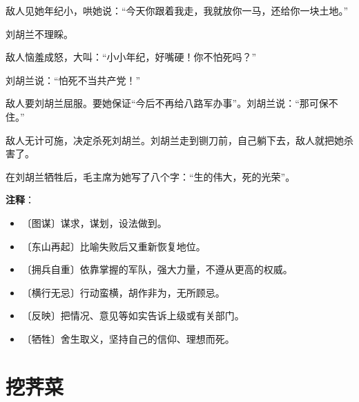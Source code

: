 \documentclass[12pt,UTF-8,openany]{ctexbook}
\begin{document}
\begin{normalsize}
    敌人见她年纪小，哄她说：“今天你跟着我走，我就放你一马，还给你一块土地。”
    
    刘胡兰不理睬。
    
    敌人恼羞成怒，大叫：“小小年纪，好嘴硬！你不怕死吗？”
    
    刘胡兰说：“怕死不当共产党！”
    
    敌人要刘胡兰屈服。要她保证“今后不再给八路军办事”。刘胡兰说：“那可保不住。”
    
    敌人无计可施，决定杀死刘胡兰。刘胡兰走到铡刀前，自己躺下去，敌人就把她杀害了。
    
    在刘胡兰牺牲后，毛主席为她写了八个字：“生的伟大，死的光荣”。
    
\end{normalsize}


\newpage

\textbf{注释}：

\vspace{-1em}

\begin{itemize}
    \setlength\itemsep{-0.2em}
    \item 〔图谋〕谋求，谋划，设法做到。
    \item 〔东山再起〕比喻失败后又重新恢复地位。
    \item 〔拥兵自重〕依靠掌握的军队，强大力量，不遵从更高的权威。
    \item 〔横行无忌〕行动蛮横，胡作非为，无所顾忌。
    \item 〔反映〕把情况、意见等如实告诉上级或有关部门。
    \item 〔牺牲〕舍生取义，坚持自己的信仰、理想而死。
\end{itemize}

\chapter{挖荠菜}
\end{document}
